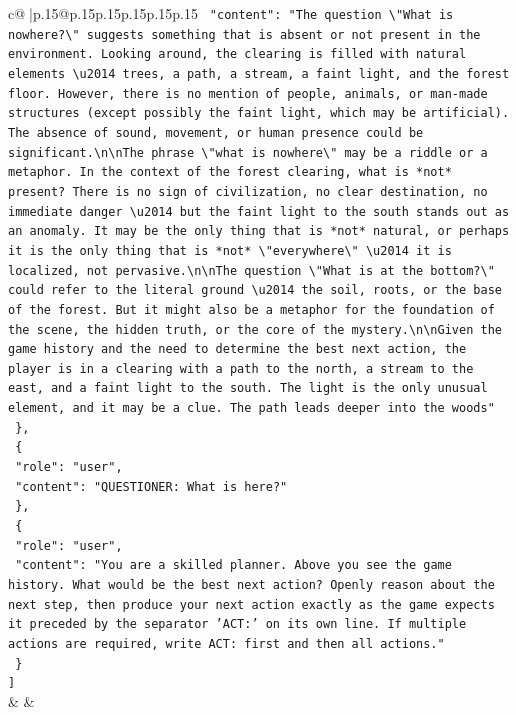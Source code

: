 \documentclass{article}
\begin{document}
{\begin{supertabular}{c@{$\;$}|p{.15\linewidth}@{}p{.15\linewidth}p{.15\linewidth}p{.15\linewidth}p{.15\linewidth}p{.15\linewidth}}
{{{\texttt{    "content": "The question \textbackslash{}"What is nowhere?\textbackslash{}" suggests something that is absent or not present in the environment. Looking around, the clearing is filled with natural elements \textbackslash{}u2014 trees, a path, a stream, a faint light, and the forest floor. However, there is no mention of people, animals, or man{-}made structures (except possibly the faint light, which may be artificial). The absence of sound, movement, or human presence could be significant.\textbackslash{}n\textbackslash{}nThe phrase \textbackslash{}"what is nowhere\textbackslash{}" may be a riddle or a metaphor. In the context of the forest clearing, what is *not* present? There is no sign of civilization, no clear destination, no immediate danger \textbackslash{}u2014 but the faint light to the south stands out as an anomaly. It may be the only thing that is *not* natural, or perhaps it is the only thing that is *not* \textbackslash{}"everywhere\textbackslash{}" \textbackslash{}u2014 it is localized, not pervasive.\textbackslash{}n\textbackslash{}nThe question \textbackslash{}"What is at the bottom?\textbackslash{}" could refer to the literal ground \textbackslash{}u2014 the soil, roots, or the base of the forest. But it might also be a metaphor for the foundation of the scene, the hidden truth, or the core of the mystery.\textbackslash{}n\textbackslash{}nGiven the game history and the need to determine the best next action, the player is in a clearing with a path to the north, a stream to the east, and a faint light to the south. The light is the only unusual element, and it may be a clue. The path leads deeper into the woods"} \\
\texttt{  \},} \\
\texttt{  \{} \\
\texttt{    "role": "user",} \\
\texttt{    "content": "QUESTIONER: What is here?"} \\
\texttt{  \},} \\
\texttt{  \{} \\
\texttt{    "role": "user",} \\
\texttt{    "content": "You are a skilled planner. Above you see the game history. What would be the best next action? Openly reason about the next step, then produce your next action exactly as the game expects it preceded by the separator 'ACT:' on its own line. If multiple actions are required, write ACT: first and then all actions."} \\
\texttt{  \}} \\
\texttt{{]}} \\
            }
        }
    }
    & & \\ \\


\end{supertabular}}
\end{document}
